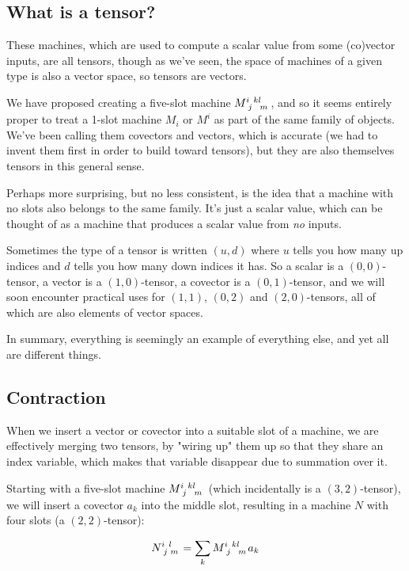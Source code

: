 \subsection{What is a tensor?}

These machines, which are used to compute a scalar value from some (co)vector inputs, are all tensors, though as we've seen, the space of machines of a given type is also a vector space, so tensors are vectors.

We have proposed creating a five-slot machine $M\indices{^i_j^k^l_m}$, and so it seems entirely proper to treat a 1-slot machine $M_i$ or $M^i$ as part of the same family of objects. We've been calling them covectors and vectors, which is accurate (we had to invent them first in order to build toward tensors), but they are also themselves tensors in this general sense.

Perhaps more surprising, but no less consistent, is the idea that a machine with no slots also belongs to the same family. It's just a scalar value, which can be thought of as a machine that produces a scalar value from \textit{no} inputs.

Sometimes the type of a tensor is written $(u, d)$ where $u$ tells you how many up indices and $d$ tells you how many down indices it has. So a scalar is a $(0, 0)$-tensor, a vector is a $(1, 0)$-tensor, a covector is a $(0, 1)$-tensor, and we will soon encounter practical uses for $(1, 1)$, $(0, 2)$ and $(2, 0)$-tensors, all of which are also elements of vector spaces.

In summary, everything is seemingly an example of everything else, and yet all are different things.

\subsection{Contraction} \label{tensor-contraction}

When we insert a vector or covector into a suitable slot of a machine, we are effectively merging two tensors, by "wiring up" them up so that they share an index variable, which makes that variable disappear due to summation over it.

Starting with a five-slot machine $M\indices{^i_j^k^l_m}$ (which incidentally is a $(3,2)$-tensor), we will insert a covector $a_k$ into the middle slot, resulting in a machine $N$ with four slots (a $(2,2)$-tensor):

$$
N\indices{^i_j^l_m} = \sum_{k} M\indices{^i_j^k^l_m} a_k
$$

